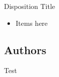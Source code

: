 \begin{frame}{\secname}{Disposition}
	Title
	\begin{itemize}
		\item Items here
	\end{itemize}
\end{frame}

\subsection{Authors}\label{sec:authors}
\begin{frame}{\secname}{\subname}
	Test
\end{frame}
